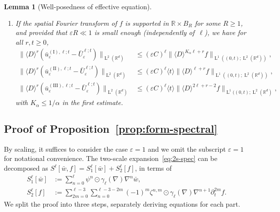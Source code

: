 \documentclass[10pt]{amsart}
\newenvironment{enumeratei}
{\bgroup\def\theenumi{\roman{enumi}}\def\theenumii{\arabic{enumii}}\begin{enumerate}}
{\end{enumerate}\egroup}
\theoremstyle{plain}
\newtheorem{lem0}[theor0]{Lemma}
\newenvironment{lem}
{\renewcommand{\qedsymbol}{$\lozenge$}\pushQED{\qed}\begin{lem0}}
{\popQED\end{lem0}}
\theoremstyle{definition}
\numberwithin{equation}{section}
\newcommand{\e}{\varepsilon}
\newcommand{\R}{\mathbb R}
\newcommand{\Ld}{\operatorname{L}}
\begin{document}
\begin{lem}[Well-posedness of effective equation]
\begin{enumeratei}
\item\label{lem:apriori-baru-spiii} If the spatial Fourier transform of $f$ is supported in $\R\times B_R$ for some $R\ge1$, and provided that $\e R\ll1$ is small enough (independently of~$\ell$), we have for all $r,t\ge0$,
\begin{align*}
\|\langle D\rangle^r(\bar u_\e^{\operatorname{(I)},\ell;t}-\bar U_\e^{\ell;t})\|_{\Ld^2(\R^d)}&\le (\e C)^{\ell}\|\langle D\rangle^{K_{\alpha}\ell+r}f\|_{\Ld^1((0,t);\Ld^2(\R^d))},
\\
\|\langle D\rangle^r(\bar u_\e^{\operatorname{(II)},\ell;t}-\bar U_\e^{\ell;t})\|_{\Ld^2(\R^d)}&\le (\e C)^{\ell}\langle t\rangle \|\langle D\rangle^{\ell+r}f\|_{\Ld^1((0,t);\Ld^2(\R^d))} ,
\\
\|\langle D\rangle^r(\bar u_\e^{\operatorname{(III)},\ell;t}-\bar U_\e^{\ell;t})\|_{\Ld^2(\R^d)}&\le (\e C)^{\ell}\langle t\rangle \|\langle D \rangle^{2\ell+r-2}f\|_{\Ld^1((0,t);\Ld^2(\R^d)},
\end{align*}
with {$K_{\alpha}\le1/\alpha$} in the first estimate.
\qedhere
\end{enumeratei}
\end{lem}

\subsection{Proof of Proposition~\ref{prop:form-spectral}}\label{sec:pr-prop:form-spectral}
By scaling, it suffices to consider the case $\e=1$ and we omit the subscript $\e=1$ for notational convenience. The two-scale expansion~\eqref{eq:2s-spec} can be decomposed as $S^\ell[\bar w,f]=S_1^{\ell}[\bar w]+S_2^{\ell}[f]$, in terms of\vspace*{-3pt}
\begin{align*}
S_1^{\ell}[\bar w]&:= \sum_{n=0}^\ell\psi^n \odot \gamma_{\ell}(\nabla)\nabla^n\bar w,\\
S_2^{\ell}[f]&:= \sum_{2m=0}^{\ell-3}\sum_{n=0}^{\ell-3-2m}(-1)^m\zeta^{n,m}\odot\gamma_{\ell}(\nabla) \nabla^{n+1}\partial_t^{2m} f.
\end{align*}
We split the proof into three steps, separately deriving equations for each part.
\end{document}
